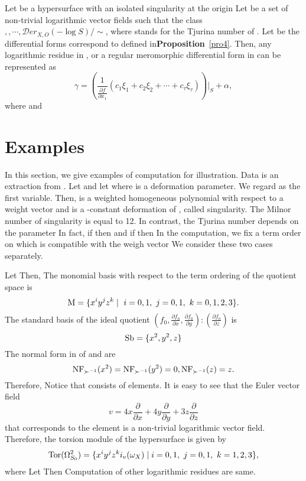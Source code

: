 \documentclass{arxsigma}
\begin{document}
\begin{theorem}
Let   be a hypersurface with an isolated singularity at the origin   Let   be a set of non-trivial logarithmic vector fields such that
the class $ , , \cdots,
 {\mathcal Der}_{X,O}(-\log S)/\sim$, where
  stands for the Tjurina number of  . Let   be the differential forms correspond to
  defined in{\bf Proposition}~\ref{pro4}.
Then, any logarithmic residue in  , or a regular meromorphic differential form   in   can be represented as
\begin{equation*}
\gamma = \left(\frac{1}{\frac{\partial f}{\partial x_1}}(c_1\xi_1+c_2\xi_2+ \cdots +c_{\tau}\xi_{\tau})\right)|_S + \alpha,
\end{equation*}
where   and  
\end{theorem}
\section{Examples}
In this section, we give
examples of computation for illustration. Data is an
extraction from \cite{TN20}.
Let   and let  
where   is a deformation parameter. We regard   as the first variable. Then,   is a weighted homogeneous polynomial with respect to a weight
vector   and   is a  -constant deformation of  , called   singularity. The Milnor number
  of   singularity is equal to 12. In contrast, the Tjurina number
  depends on the parameter   In fact,
if   then   and if   then   In the computation, we fix a term order   on  
which is compatible with the weigh vector  
We consider these two cases separately.
\begin{example}
Let   Then,  
The monomial basis   with respect to the term ordering   of the quotient space
  is
\begin{equation*}{\rm M} = \{ x^i y^j z^k \mid \ i=0,1, \ j=0,1, \ k=0,1,2,3 \}.
\end{equation*}
The standard basis   of the ideal quotient
$ (f_0, \frac{\partial f_0}{\partial x}, \frac{\partial f_0}{\partial y}): (\frac{\partial f_0}{\partial z})
$ is
\begin{equation*}{\rm Sb} = \{ x^2, y^2, z \}
\end{equation*}
The normal form in
  of   and   are
\begin{equation*}{\rm NF}_{\succ^{-1}}(x^2) ={\rm NF}_{\succ^{-1}}(y^2) = 0,{\rm NF}_{\succ^{-1}}(z) = z.
\end{equation*}
Therefore,
  Notice that   consists of   elements. It is easy to see that the Euler vector field
\begin{equation*}
v= 4x\frac{\partial}{\partial x} + 4y\frac{\partial}{\partial y} +3z\frac{\partial}{\partial z}
\end{equation*}
that corresponds to the element   is a non-trivial logarithmic vector field. Therefore, the torsion module of the hypersurface
  is given by
\begin{equation*}{\rm Tor}(\Omega_{S_0}^2) = \{ x^iy^jz^k i_v(\omega_X) \mid i=0,1, \ j=0,1, \ k=1,2,3 \},
\end{equation*}
where  
Let   Then   Computation of other logarithmic residues are same.
\end{example}
\end{document}
